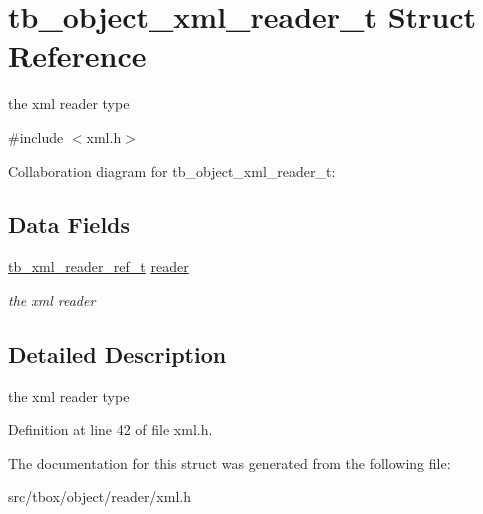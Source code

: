 \hypertarget{structtb__object__xml__reader__t}{\section{tb\-\_\-object\-\_\-xml\-\_\-reader\-\_\-t Struct Reference}
\label{structtb__object__xml__reader__t}
}


the xml reader type  




{\ttfamily \#include $<$xml.\-h$>$}



Collaboration diagram for tb\-\_\-object\-\_\-xml\-\_\-reader\-\_\-t\-:
\subsection*{Data Fields}
\begin{DoxyCompactItemize}
\item 
\hypertarget{structtb__object__xml__reader__t_a7a3ed90b81d81e2cf881a33acae1ac4c}{\hyperlink{structtb__xml__reader__ref__t}{tb\-\_\-xml\-\_\-reader\-\_\-ref\-\_\-t} \hyperlink{structtb__object__xml__reader__t_a7a3ed90b81d81e2cf881a33acae1ac4c}{reader}}\label{structtb__object__xml__reader__t_a7a3ed90b81d81e2cf881a33acae1ac4c}

\begin{DoxyCompactList}\small\item\em the xml reader \end{DoxyCompactList}\end{DoxyCompactItemize}


\subsection{Detailed Description}
the xml reader type 

Definition at line 42 of file xml.\-h.



The documentation for this struct was generated from the following file\-:\begin{DoxyCompactItemize}
\item 
src/tbox/object/reader/xml.\-h\end{DoxyCompactItemize}
